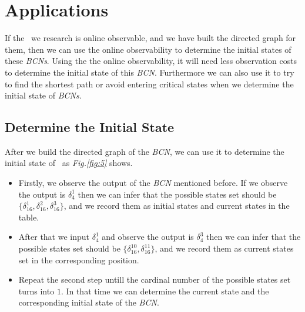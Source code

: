 \section{Applications}
\label{sec:app}
If the \BCNs\ we research is online observable, and we have built the directed graph for them, then we can use the online observability to determine the initial states of these {\em BCNs}. Using the the online observability, it will need less observation costs to determine the initial state of this {\em BCN}. Furthermore we can also use it to try to find the shortest path or avoid entering critical states when we determine the initial state of {\em BCNs}. %

\subsection{Determine the Initial State}

After we build the directed graph of the {\em BCN}, we can use it to determine the initial state of \BCNs\ as {\em Fig.\ref{fig:5}} shows. 
\begin{itemize}
  \item Firstly, we observe the output of the {\em BCN} mentioned before. If we observe the output is $\delta_4^1$ then we can infer that the possible states set should be $\{\delta_{16}^1,\delta_{16}^2,\delta_{16}^3\}$, and we record them as initial states and current states in the table. 
  \item After that we input  $\delta_4^1$ and observe the output is $\delta_4^3$ then we can infer that the possible states set should be $\{\delta_{16}^{10},\delta_{16}^{11}\}$, and we record them as current states set in the corresponding position. 
 \item Repeat the second step untill the cardinal number of the possible states set turns into $1$. In that time we can determine the current state and the corresponding initial state of the {\em BCN}.
\end{itemize} 

